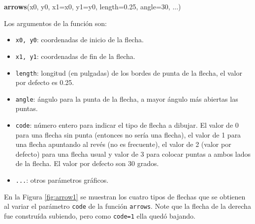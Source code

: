 \documentclass[10pt,]{krantz}
\makeatletter
\newenvironment{Shaded}{\begin{snugshade}}{\end{snugshade}}
\newcommand{\KeywordTok}[1]{\textcolor[rgb]{0.13,0.29,0.53}{\textbf{{#1}}}}
\newcommand{\DataTypeTok}[1]{\textcolor[rgb]{0.13,0.29,0.53}{{#1}}}
\newcommand{\DecValTok}[1]{\textcolor[rgb]{0.00,0.00,0.81}{{#1}}}
\newcommand{\FloatTok}[1]{\textcolor[rgb]{0.00,0.00,0.81}{{#1}}}
\newcommand{\NormalTok}[1]{{#1}}
\providecommand{\tightlist}{%
  \setlength{\itemsep}{0pt}\setlength{\parskip}{0pt}}
\newenvironment{kframe}{%
\medskip{}
\setlength{\fboxsep}{.8em}
 \def\at@end@of@kframe{}%
 \ifinner\ifhmode%
  \def\at@end@of@kframe{\end{minipage}}%
  \begin{minipage}{\columnwidth}%
 \fi\fi%
 \def\FrameCommand##1{\hskip\@totalleftmargin \hskip-\fboxsep
 \colorbox{shadecolor}{##1}\hskip-\fboxsep
     \hskip-\linewidth \hskip-\@totalleftmargin \hskip\columnwidth}%
 \MakeFramed {\advance\hsize-\width
   \@totalleftmargin\z@ \linewidth\hsize
   \@setminipage}}%
 {\par\unskip\endMakeFramed%
 \at@end@of@kframe}
\renewenvironment{Shaded}{\begin{kframe}}{\end{kframe}}
\makeatother
\begin{document}
\begin{Shaded}
\begin{Highlighting}[]
\KeywordTok{arrows}\NormalTok{(x0, y0, }\DataTypeTok{x1=}\NormalTok{x0, }\DataTypeTok{y1=}\NormalTok{y0, }\DataTypeTok{length=}\FloatTok{0.25}\NormalTok{, }\DataTypeTok{angle=}\DecValTok{30}\NormalTok{, ...)}
\end{Highlighting}
\end{Shaded}

Los argumentos de la función son:

\begin{itemize}
\tightlist
\item
  \texttt{x0,\ y0}: coordenadas de inicio de la flecha.
\item
  \texttt{x1,\ y1}: coordenadas de fin de la flecha.
\item
  \texttt{length}: longitud (en pulgadas) de los bordes de punta de la
  flecha, el valor por defecto es 0.25.
\item
  \texttt{angle}: ángulo para la punta de la flecha, a mayor ángulo más
  abiertas las puntas.
\item
  \texttt{code}: número entero para indicar el tipo de flecha a dibujar.
  El valor de 0 para una flecha sin punta (entonces no sería una
  flecha), el valor de 1 para una flecha apuntando al revés (no es
  frecuente), el valor de 2 (valor por defecto) para una flecha usual y
  valor de 3 para colocar puntas a ambos lados de la flecha. El valor
  por defecto son 30 grados.
\item
  \texttt{...}: otros parámetros gráficos.
\end{itemize}

En la Figura \ref{fig:arrow1} se muestran los cuatro tipos de flechas
que se obtienen al variar el parámetro \texttt{code} de la función
\texttt{arrows}. Note que la flecha de la derecha fue construída
subiendo, pero como \texttt{code=1} ella quedó bajando.
\end{document}
